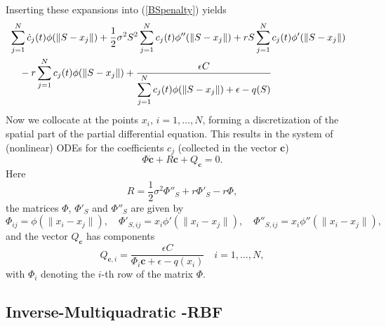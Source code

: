 \documentclass[12pt]{article}
\numberwithin{equation}{section} %
\begin{document}
Inserting these expansions into (\ref{BSpenalty}) yields
\begin{eqnarray*}
& \displaystyle \sum_{j=1}^N \dot{c}_j(t) \phi(\|S-x_j\|) +
\frac{1}{2}\sigma^2 S^2 \sum_{j=1}^N c_j(t) \phi''(\|S-x_j\|) +
rS\sum_{j=1}^N c_j(t) \phi'(\|S-x_j\|)& \cr & \displaystyle \quad -
r \sum_{j=1}^N c_j(t) \phi(\|S-x_j\|) +\frac{\epsilon C
}{\displaystyle \sum_{j=1}^N c_j(t) \phi(\|S-x_j\|) + \epsilon -
q(S)}
\end{eqnarray*}
Now we collocate at the points $x_i$, $i=1,\ldots,N$, forming a
discretization of the spatial part of the partial differential
equation. This results in the system of (nonlinear) ODEs for the
coefficients $c_j$ (collected in the vector $\textbf{c}$)
$$
\Phi \dot{\textbf{c}} + R \textbf{c} + Q_{\textbf{c}} = 0.
$$
Here
$$
R = \frac{1}{2} \sigma^2 \Phi''_S + r \Phi'_S - r \Phi,
$$
the matrices $\Phi$, $\Phi'_S$ and $\Phi''_S$ are given by
$$
\Phi_{ij} = \phi(\|x_i-x_j\|), \quad \Phi'_{S,ij} =
x_i\phi'(\|x_i-x_j\|), \quad \Phi''_{S,ij} = x_i\phi''(\|x_i-x_j\|),
$$
and the vector $Q_{\textbf{c}}$ has components
$$
 Q_{\textbf{c},i}=\frac{\epsilon C}{\Phi_i\textbf{c}+\epsilon-q(x_i)} \quad  i=1,\ldots,N,
$$
with $\Phi_i$ denoting the $i$-th row of the matrix $\Phi$.




\subsection{Inverse-Multiquadratic -RBF }
\end{document}
